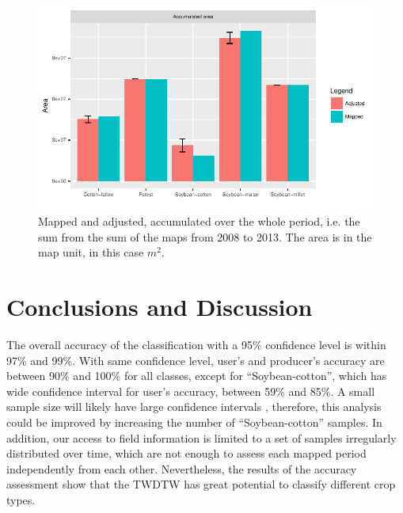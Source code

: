\documentclass[article,shortnames]{jss}
\begin{document}
\begin{CodeChunk}
\begin{figure}[!ht]

{\centering \includegraphics{applying_twdtw_files/figure-latex/plot-area-and-uncertainty-1} 

}

\caption[Mapped and adjusted, accumulated over the whole period, i.e]{Mapped and adjusted, accumulated over the whole period, i.e. the sum from the sum of the maps from 2008 to 2013. The area is in the map unit, in this case $m^2$.}\label{fig:plot-area-and-uncertainty}
\end{figure}
\end{CodeChunk}

\section{Conclusions and Discussion}\label{conclusions-and-discussion}

The overall accuracy of the classification with a 95\% confidence level
is within 97\% and 99\%. With same confidence level, user's and
producer's accuracy are between 90\% and 100\% for all classes, except
for ``Soybean-cotton'', which has wide confidence interval for user's
accuracy, between 59\% and 85\%. A small sample size will likely have
large confidence intervals \citep{Foody:2009}, therefore, this analysis
could be improved by increasing the number of ``Soybean-cotton''
samples. In addition, our access to field information is limited to a
set of samples irregularly distributed over time, which are not enough
to assess each mapped period independently from each other.
Nevertheless, the results of the accuracy assessment show that the TWDTW
has great potential to classify different crop types.
\end{document}
